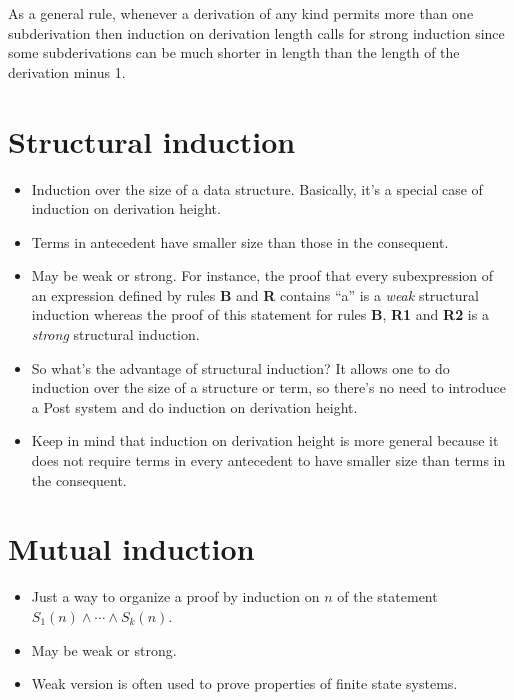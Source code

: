 \documentclass[12pt]{article}
\begin{document}
As a general rule, whenever a derivation of any kind permits more than one subderivation then
induction on derivation length calls for strong induction since some subderivations can be
much shorter in length than the length of the derivation minus 1.  

\section{Structural induction}

\begin{itemize}
\item  Induction over the size of a data structure.
Basically, it's a special case of induction on derivation height.

\item Terms in antecedent have smaller size than those in the consequent.

\item May be weak or strong.
For instance, the proof that every subexpression of an expression defined by rules {\bf B} and {\bf R}
contains ``a'' is a {\em weak\/} structural induction whereas the proof of this statement for
rules {\bf B}, {\bf R1} and {\bf R2} is a {\em strong\/} structural induction.

\item So what's the advantage of structural induction?
It allows one to do induction over the size of a structure or term, so there's no
need to introduce a Post system and do induction on derivation height.

\item Keep in mind that induction on derivation height is more general because
it does not require terms in every antecedent to have smaller size than terms in the consequent.
\end{itemize}

\section{Mutual induction}

\begin{itemize}

\item Just a way to organize a proof by induction on $n$ of the statement $S_1(n)\wedge\cdots\wedge S_k(n)$.

\item May be weak or strong.

\item Weak version is often used to prove properties of finite state systems.
\end{itemize}
\end{document}
